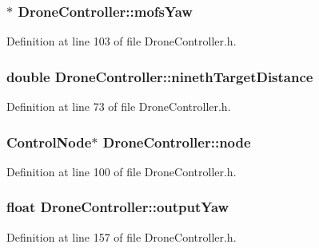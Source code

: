 \subsubsection[{mofs\-Yaw}]{$\ast$ Drone\-Controller\-::mofs\-Yaw}\label{classDroneController_a7e477128c075463c66ae612b75c72bf8}


Definition at line 103 of file Drone\-Controller.\-h.

\subsubsection[{nineth\-Target\-Distance}]{\setlength{\rightskip}{0pt plus 5cm}double Drone\-Controller\-::nineth\-Target\-Distance\hspace{0.3cm}{\ttfamily [private]}}\label{classDroneController_aeafca540b464ef6ecb100a2006556023}


Definition at line 73 of file Drone\-Controller.\-h.

\subsubsection[{node}]{\setlength{\rightskip}{0pt plus 5cm}Control\-Node$\ast$ Drone\-Controller\-::node}\label{classDroneController_a748e14506b8033c62b1bfb695e52c79e}


Definition at line 100 of file Drone\-Controller.\-h.

\subsubsection[{output\-Yaw}]{\setlength{\rightskip}{0pt plus 5cm}float Drone\-Controller\-::output\-Yaw}\label{classDroneController_a5018f016f55e89ec2babf6e4623d67f7}


Definition at line 157 of file Drone\-Controller.\-h.

